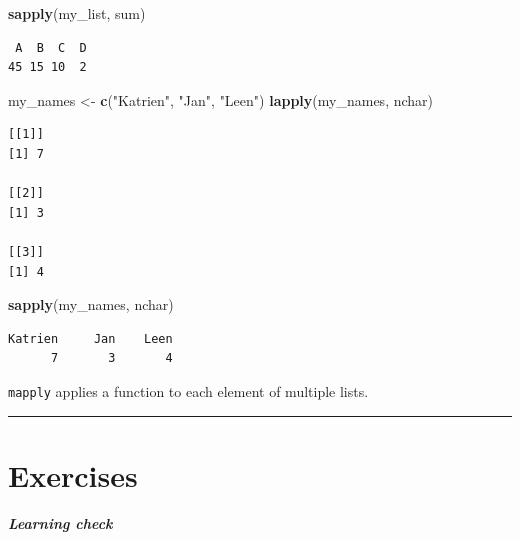 \documentclass[
]{book}
\newenvironment{Shaded}{\begin{snugshade}}{\end{snugshade}}
\newcommand{\KeywordTok}[1]{\textcolor[rgb]{0.13,0.29,0.53}{\textbf{#1}}}
\newcommand{\NormalTok}[1]{#1}
\newcommand{\StringTok}[1]{\textcolor[rgb]{0.31,0.60,0.02}{#1}}
\begin{document}
\begin{Shaded}
\begin{Highlighting}[]
\KeywordTok{sapply}\NormalTok{(my_list, sum)}
\end{Highlighting}
\end{Shaded}

\begin{verbatim}
 A  B  C  D 
45 15 10  2 
\end{verbatim}

\begin{Shaded}
\begin{Highlighting}[]
\NormalTok{my_names <-}\StringTok{ }\KeywordTok{c}\NormalTok{(}\StringTok{"Katrien"}\NormalTok{, }\StringTok{"Jan"}\NormalTok{, }\StringTok{"Leen"}\NormalTok{)}
\KeywordTok{lapply}\NormalTok{(my_names, nchar)}
\end{Highlighting}
\end{Shaded}

\begin{verbatim}
[[1]]
[1] 7

[[2]]
[1] 3

[[3]]
[1] 4
\end{verbatim}

\begin{Shaded}
\begin{Highlighting}[]
\KeywordTok{sapply}\NormalTok{(my_names, nchar)}
\end{Highlighting}
\end{Shaded}

\begin{verbatim}
Katrien     Jan    Leen 
      7       3       4 
\end{verbatim}

\texttt{mapply} applies a function to each element of multiple lists.

\begin{center}\rule{0.5\linewidth}{0.5pt}\end{center}

\hypertarget{exercises}{%
\section{Exercises}\label{exercises}}

\begin{learncheck}
\textbf{\emph{Learning check}}
\end{learncheck}
\end{document}
